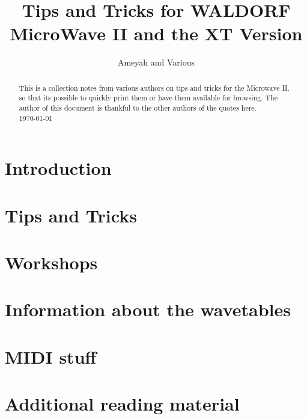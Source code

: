 \documentclass[a4paper,12pt,leqno]{article}%
\title{Tips and Tricks for WALDORF MicroWave II and the XT Version}
\author{Ameyah and Various}
\theoremstyle{plain}
\begin{document}
\maketitle
\begin{abstract}
	\noindent
	This is a collection notes from various authors on tips and tricks for the Microwave II, so that its possible to quickly print them or have them available for browsing. The author of this document is thankful to the other authors of the quotes here.\\
	\today
\end{abstract}

\newpage

\tableofcontents

\newpage

\section{Introduction}

\section{Tips and Tricks}

\section{Workshops}

\section{Information about the wavetables}

\section{MIDI stuff}

\section{Additional reading material}

\end{document}
